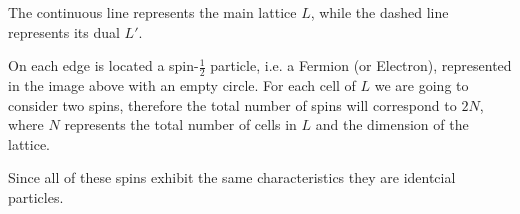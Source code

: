 \documentclass[12pt]{report}
\begin{document}
\begin{minipage}{1\textwidth}
\begin{center}
		
	    \end{center}
	    
	    The continuous line represents the main lattice $L$, while the dashed line represents its dual $L'$.\newline 
	    
		On each edge is located a spin-$\frac{1}{2}$ particle, i.e. a Fermion (or Electron), represented in the image above with an empty circle.
		For each cell of $L$ we are going to consider two spins, therefore the total number of spins will correspond to $2N$, where $N$ represents the total number of cells in $L$ and the dimension of the lattice. \newline
		
		Since all of these spins exhibit the same characteristics they are identcial particles.
	
	\end{minipage}
	
\end{document}
